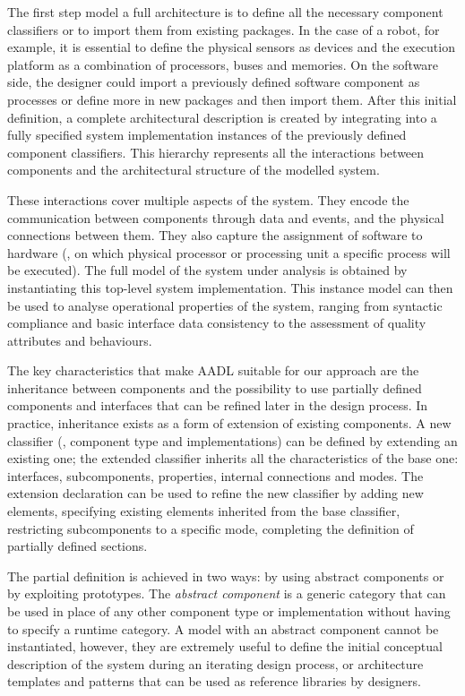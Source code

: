 The first step model a full architecture is to define all the necessary component classifiers or to import them from existing packages. In the case of a robot, for example, it is essential to define the physical sensors as devices and the execution platform as a combination of processors, buses and memories. On the software side, the designer could import a previously defined software component as processes or define more in new packages and then import them. After this initial definition, a complete architectural description is created by integrating into a fully specified system implementation instances of the previously defined component classifiers. This hierarchy represents all the interactions between components and the architectural structure of the modelled system.

These interactions cover multiple aspects of the system. They encode the communication between components through data and events, and the physical connections between them. They also capture the assignment of software to hardware (\eg, on which physical processor or processing unit a specific process will be executed). The full model of the system under analysis is obtained by instantiating this top-level system implementation. This instance model can then be used to analyse operational properties of the system, ranging from syntactic compliance and basic interface data consistency to the assessment of quality attributes and behaviours.

The key characteristics that make AADL suitable for our approach are the inheritance between components and the possibility to use partially defined components and interfaces that can be refined later in the design process. In practice, inheritance exists as a form of extension of existing components. A new classifier (\ie, component type and implementations) can be defined by extending an existing one; the extended classifier inherits all the characteristics of the base one: interfaces, subcomponents, properties, internal connections and modes. The extension declaration can be used to refine the new classifier by adding new elements, specifying existing elements inherited from the base classifier, restricting subcomponents to a specific mode, completing the definition of partially defined sections. 

The partial definition is achieved in two ways: by using abstract components or by exploiting prototypes. The \textit{abstract component} is a generic category that can be used in place of any other component type or implementation without having to specify a runtime category. A model with an abstract component cannot be instantiated, however, they are extremely useful to define the initial conceptual description of the system during an iterating design process, or architecture templates and patterns that can be used as reference libraries by designers.

